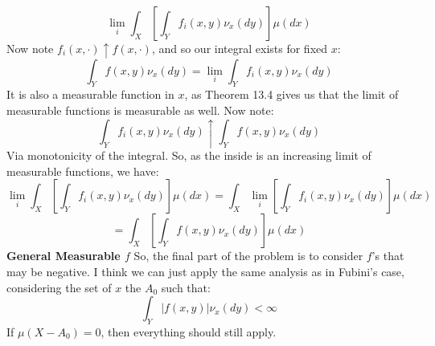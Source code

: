 \documentclass[12pt,a4paper]{article}
\newcommand{\1}[1]{\mathbbm{1}\left\{ #1 \right\}}
\begin{document}
\begin{enumerate}
$$		\lim_i \int_X \left[\int_Y f_i(x,y) \nu_x(dy)\right] \mu(dx)
	$$
	Now note $f_i(x, \cdot) \uparrow f(x, \cdot)$, and so our integral exists for fixed $x$:
	$$
		\int_Y f(x,y) \nu_x(dy) = \lim_i \int_Y f_i(x,y) \nu_x(dy)
	$$
	It is also a measurable function in $x$, as Theorem 13.4 gives us that the limit of measurable functions is measurable as well. Now note:
	$$
		\int_Y f_i(x,y) \nu_x(dy) \uparrow \int_Y f(x,y) \nu_x(dy)
	$$
	Via monotonicity of the integral. So, as the inside is an increasing limit of measurable functions, we have:
	$$
		\lim_i \int_X \left[\int_Y f_i(x,y) \nu_x(dy)\right] \mu(dx) =
		\int_X \lim_i \left[\int_Y f_i(x,y) \nu_x(dy)\right] \mu(dx)
	$$
	$$
		=
		\int_X \left[\int_Y f(x,y) \nu_x(dy)\right] \mu(dx)
	$$
	\textbf{General Measurable $f$} So, the final part of the problem is to consider $f$'s that may be negative. I think we can just apply the same analysis as in Fubini's case, considering the set of $x$ the $A_0$ such that:
	$$
		\int_Y |f(x,y)| \nu_x(dy) < \infty
	$$
	If $\mu(X - A_0) = 0$, then everything should still apply.
	

\end{enumerate}
\end{document}

